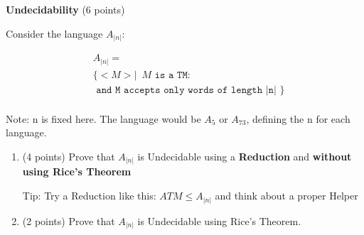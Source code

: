 \documentclass[12pt]{article}
\newenvironment{question}[2][Question]{\begin{trivlist}
\item[\hskip \labelsep {\bfseries #1}\hskip \labelsep {\bfseries #2.}]}{\end{trivlist}}
\begin{document}
\begin{question}{4}\textbf{Undecidability} (6 points)

Consider the language $A_{|n|}$:


    \begin{align*}
        &A_{|n|} = \\
        &\{ < M > \vert \;  \ M   \texttt{ is a TM: } \\
        &\texttt{ and M accepts only words of length |n| }
        \}\\
    \end{align*}

Note: n is fixed here. The language would be $A_5$ or $A_{73}$, defining the n for each language.

\begin{enumerate}
    \item (4 points) Prove that $A_{|n|}$ is Undecidable using a \textbf{Reduction} and \textbf{without using Rice's Theorem}

Tip: Try a Reduction like this: $ATM\leq A_{|n|}$ and think about a proper Helper
\vspace{13em}

    \item (2 points) Prove that $A_{|n|}$ is Undecidable using Rice's Theorem.
\end{enumerate}


\end{question}

\newpage
\end{document}
